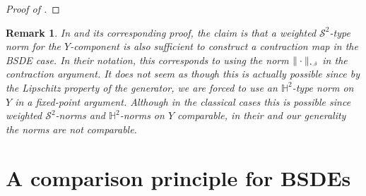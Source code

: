 \documentclass[10pt]{article} %
\newtheorem{remark}[theorem]{Remark}
\newcommand\cS{\mathcal S}
\newcommand{\smalltext}[1]{\text{\fontsize{4}{4}\selectfont$#1$}}
\def \H{\mathbb{H}}
\begin{document}
\begin{proof}[Proof of ]
\end{proof}

\begin{remark}
	In {\rm\cite[Theorem 3.5]{papapantoleon2018existence}} and its corresponding proof, the claim is that a weighted $\cS^2$-type norm for the $Y$-component is also sufficient to construct a contraction map in the \emph{BSDE} case. In their notation, this corresponds to using the norm $\|\cdot\|_{\smalltext{\star}\smalltext{,}\smalltext{\hat\beta}}$ in the contraction argument. It does not seem as though this is actually possible since by the Lipschitz property of the generator, we are forced to use an $\H^2$-type norm on $Y$ in a fixed-point argument. Although in the classical cases this is possible since weighted $\cS^2$-norms and $\H^2$-norms on $Y$ comparable, in their and our generality the norms are not comparable.	
\end{remark}

\section{A comparison principle for BSDEs}\label{sec::comparison}
\end{document}
